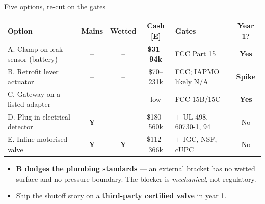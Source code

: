 \documentclass[aspectratio=169,t,10pt,xcolor={table,svgnames}]{beamer}
\newcommand{\yes}{\textbf{Y}}
\newcommand{\no}{--}
\newcommand{\hd}[1]{\textbf{\footnotesize #1}}
\begin{document}
\begin{frame}{Five options, re-cut on the gates}
  \scriptsize
  \begin{tabular}{@{}p{}cccp{}c@{}}
    \toprule
    \hd{Option} & \hd{Mains} & \hd{Wetted} & \hd{Cash [E]} & \hd{Gates} & \hd{Year 1?} \\
    \midrule
    A. Clamp-on leak sensor (battery)   & \no  & \no  & \textbf{\$31--94k}  & FCC Part 15            & \cellcolor{fill1}\textbf{Yes} \\
    B. Retrofit lever actuator          & \no  & \no  & \$70--231k          & FCC; IAPMO likely N/A  & \cellcolor{fill1}\textbf{Spike} \\
    C. Gateway on a listed adapter      & \no  & \no  & low                 & FCC 15B/15C            & \cellcolor{fill1}\textbf{Yes} \\
    D. Plug-in electrical detector      & \yes & \no  & \$180--560k         & $+$ UL 498, 60730-1, 94 & \cellcolor{fill2}No \\
    E. Inline motorised valve           & \yes & \yes & \$112--366k         & $+$ IGC, NSF, cUPC     & \cellcolor{fill2}No \\
    \bottomrule
  \end{tabular}
  \vspace{0.8em}
  \begin{itemize}\footnotesize
    \item \textbf{B dodges the plumbing standards} --- an external bracket has no wetted surface and
          no pressure boundary. The blocker is \emph{mechanical}, not regulatory.
    \item Ship the shutoff story on a \textbf{third-party certified valve} in year 1.
  \end{itemize}
\end{frame}
\end{document}
